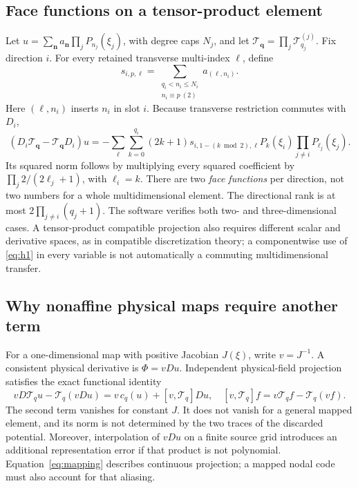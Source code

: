 \documentclass[11pt,a4paper]{article}
\theoremstyle{remark}\newtheorem{remark}[theorem]{Remark}
\newcommand{\T}{\mathcal{T}}
\begin{document}
\subsection{Face functions on a tensor-product element}
Let \(u=\sum_{\boldsymbol n}a_{\boldsymbol n}\prod_jP_{n_j}(\xi_j)\),
with degree caps \(N_j\), and let
\(\T_{\boldsymbol q}=\prod_j\T_{q_j}^{(j)}\). Fix direction \(i\).
For every retained transverse multi-index \(\boldsymbol\ell\), define
\begin{equation}
 s_{i,p,\boldsymbol\ell}
 =\sum_{\substack{q_i<n_i\le N_i\\n_i\equiv p\ (2)}}
 a_{(\boldsymbol\ell,n_i)}.
 \label{eq:tensortail}
\end{equation}
Here \((\boldsymbol\ell,n_i)\) inserts \(n_i\) in slot \(i\).
Because transverse restriction commutes with \(D_i\),
\begin{equation}
 (D_i\T_{\boldsymbol q}-\T_{\boldsymbol q}D_i)u
 =-\sum_{\boldsymbol\ell}\sum_{k=0}^{q_i}
 (2k+1)s_{i,1-(k\bmod2),\boldsymbol\ell}
 P_k(\xi_i)\prod_{j\ne i}P_{\ell_j}(\xi_j).
 \label{eq:tensoridentity}
\end{equation}
Its squared norm follows by multiplying every squared coefficient by
\(\prod_j2/(2\ell_j+1)\), with \(\ell_i=k\).
There are two \emph{face functions} per direction, not two numbers for a
whole multidimensional element. The directional rank is at most
\(2\prod_{j\ne i}(q_j+1)\). The software verifies both two- and
three-dimensional cases. A tensor-product compatible projection also requires
different scalar and derivative spaces, as in compatible discretization
theory; a componentwise use of \eqref{eq:h1} in every variable is not
automatically a commuting multidimensional transfer.

\subsection{Why nonaffine physical maps require another term}
For a one-dimensional map with positive Jacobian \(J(\xi)\), write
\(v=J^{-1}\). A consistent physical derivative is \(\Phi=vDu\).
Independent physical-field projection satisfies the exact functional identity
\begin{equation}
 vD\T_q u-\T_q(vDu)
 =v\,c_q(u)+[v,\T_q]Du,
 \quad [v,\T_q]f=v\T_q f-\T_q(vf).
 \label{eq:mapping}
\end{equation}
The second term vanishes for constant \(J\). It does not vanish for a
general mapped element, and its norm is not determined by the two traces of
the discarded potential. Moreover, interpolation of \(vDu\) on a finite
source grid introduces an additional representation error if that product is
not polynomial. Equation~\eqref{eq:mapping} describes continuous projection;
a mapped nodal code must also account for that aliasing.
\end{document}
